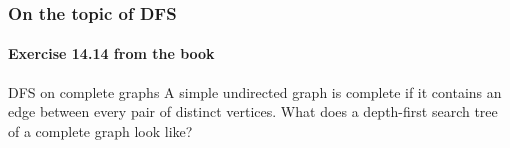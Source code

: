 \documentclass[aspectratio=169]{beamer}
\begin{document}
\begin{frame}
	\frametitle{On the topic of DFS}
	\framesubtitle{Exercise 14.14 from the book}
	\begin{questionblock}{DFS on complete graphs}
		A simple undirected graph is complete if it contains an edge between every
pair of distinct vertices. What does a depth-first search tree of a complete
graph look like?
	\end{questionblock}
	
\end{frame}

\frame{\titlepage}
\end{document}
